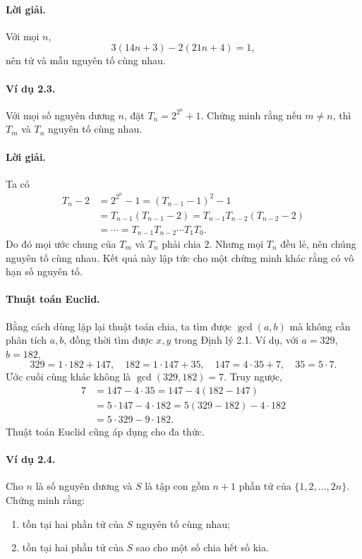 \documentclass[11pt]{article}
\begin{document}
\paragraph{Lời giải.}
Với mọi \(n\),
\[
 3(14n+3)-2(21n+4)=1,
\]
nên tử và mẫu nguyên tố cùng nhau.

\paragraph{Ví dụ 2.3.}
Với mọi số nguyên dương \(n\), đặt \(T_n=2^{2^n}+1\). Chứng minh rằng nếu
\(m\ne n\), thì \(T_m\) và \(T_n\) nguyên tố cùng nhau.

\paragraph{Lời giải.}
Ta có
\[
\begin{aligned}
 T_n-2&=2^{2^n}-1=(T_{n-1}-1)^2-1\\
 &=T_{n-1}(T_{n-1}-2)=T_{n-1}T_{n-2}(T_{n-2}-2)\\
 &=\cdots=T_{n-1}T_{n-2}\cdots T_1T_0.
\end{aligned}
\]
Do đó mọi ước chung của \(T_m\) và \(T_n\) phải chia \(2\). Nhưng mọi \(T_n\)
đều lẻ, nên chúng nguyên tố cùng nhau. Kết quả này lập tức cho một chứng minh
khác rằng có vô hạn số nguyên tố.

\paragraph{Thuật toán Euclid.}
Bằng cách dùng lặp lại thuật toán chia, ta tìm được \(\gcd(a,b)\) mà không cần
phân tích \(a,b\), đồng thời tìm được \(x,y\) trong Định lý 2.1. Ví dụ, với
\(a=329\), \(b=182\),
\[
 329=1\cdot182+147,\quad
 182=1\cdot147+35,\quad
 147=4\cdot35+7,\quad
 35=5\cdot7.
\]
Ước cuối cùng khác không là \(\gcd(329,182)=7\). Truy ngược,
\[
\begin{aligned}
7&=147-4\cdot35=147-4(182-147)\\
 &=5\cdot147-4\cdot182=5(329-182)-4\cdot182\\
 &=5\cdot329-9\cdot182.
\end{aligned}
\]
Thuật toán Euclid cũng áp dụng cho đa thức.

\paragraph{Ví dụ 2.4.}
Cho \(n\) là số nguyên dương và \(S\) là tập con gồm \(n+1\) phần tử của
\(\{1,2,\ldots,2n\}\). Chứng minh rằng:
\begin{enumerate}[label=(\alph*)]
\item tồn tại hai phần tử của \(S\) nguyên tố cùng nhau;
\item tồn tại hai phần tử của \(S\) sao cho một số chia hết số kia.
\end{enumerate}
\end{document}
